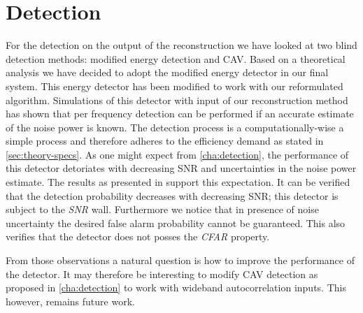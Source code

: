 \documentclass[a4paper, openany, oneside]{memoir}
\begin{document}
\section{Detection}
For the detection on the output of the reconstruction we have looked at two blind detection methods: modified energy detection and CAV. Based on  a theoretical analysis we have decided to adopt the modified energy detector in our final system. This energy detector has been modified to work with our reformulated algorithm.
Simulations of this detector with input of our reconstruction method has shown that per frequency detection
can be performed if an accurate estimate of the noise power is known. The detection process is a computationally-wise a simple process and therefore adheres to the efficiency demand as stated in \cref{sec:theory-specs}.  As one might expect from \cref{cha:detection}, the performance of this detector detoriates with decreasing SNR and uncertainties in the noise power estimate. The results as presented in  support this expectation. It can be verified that the detection probability decreases with decreasing SNR; this detector is subject to the \emph{SNR} wall. Furthermore we notice that in presence of noise uncertainty the desired false alarm probability cannot be guaranteed. This also verifies that the detector does not posses the \emph{CFAR} property.

From those observations a natural question is how to improve the performance of the detector. It may therefore be interesting to modify CAV detection as proposed in \cref{cha:detection} to work with wideband autocorrelation inputs. This however, remains future work. 
\end{document}
